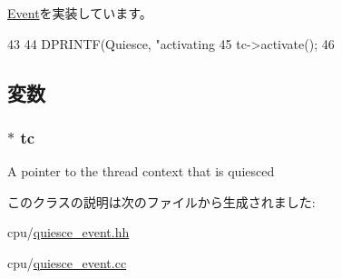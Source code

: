 \hyperlink{classEvent_a142b75b68a6291400e20fb0dd905b1c8}{Event}を実装しています。


\begin{DoxyCode}
43 {
44     DPRINTF(Quiesce, "activating %
45     tc->activate();
46 }
\end{DoxyCode}


\subsection{変数}
\hypertarget{classEndQuiesceEvent_a4455a4759e69e5ebe68ae7298cbcc37d}{
\subsubsection[{tc}]{$\ast$ {\bf tc}}}
\label{classEndQuiesceEvent_a4455a4759e69e5ebe68ae7298cbcc37d}
A pointer to the thread context that is quiesced 

このクラスの説明は次のファイルから生成されました:\begin{DoxyCompactItemize}
\item 
cpu/\hyperlink{quiesce__event_8hh}{quiesce\_\-event.hh}\item 
cpu/\hyperlink{quiesce__event_8cc}{quiesce\_\-event.cc}\end{DoxyCompactItemize}
